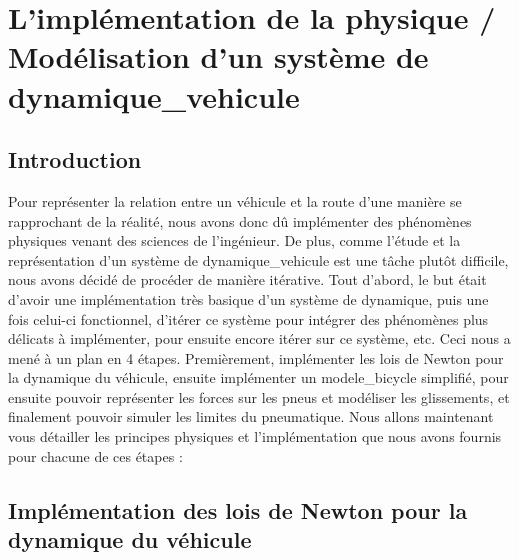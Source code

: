 \usepackage{glossaries}\section{L'implémentation de la physique / Modélisation d'un système de \gls{dynamique_vehicule}}\label{sec:l'implementation-de-la-physique-/-modelisation-d'un-systeme-de-dynamique-de-vehicule}
\subsection{Introduction}\label{subsec:introduction}
Pour représenter la relation entre un véhicule et la route d'une manière se rapprochant de la réalité, nous avons donc dû implémenter des phénomènes physiques venant des sciences de l'ingénieur.
De plus, comme l'étude et la représentation d'un système de \gls{dynamique_vehicule} est une tâche plutôt difficile, nous avons décidé de procéder de manière itérative.
Tout d'abord, le but était d'avoir une implémentation très basique d'un système de dynamique, puis une fois celui-ci fonctionnel, d'itérer ce système pour intégrer des phénomènes plus délicats à implémenter, pour ensuite encore itérer sur ce système, etc.
Ceci nous a mené à un plan en 4 étapes.
Premièrement, implémenter les lois de Newton pour la dynamique du véhicule, ensuite implémenter un \gls{modele_bicycle} simplifié, pour ensuite pouvoir représenter les forces sur les pneus et modéliser les glissements, et finalement pouvoir simuler les limites du pneumatique.
Nous allons maintenant vous détailler les principes physiques et l'implémentation que nous avons fournis pour chacune de ces étapes :

\subsection{Implémentation des lois de Newton pour la dynamique du véhicule}\label{subsec:implementation-des-lois-de-newton-pour-la-dynamique-du-vehicule}

